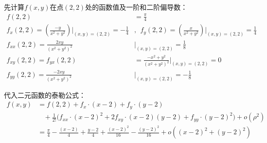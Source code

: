 \begin{solution}
先计算$f(x,y)$在点$(2,2)$处的函数值及一阶和二阶偏导数：
\begin{equation}
    \begin{aligned}
        f(2,2) &= \frac{\pi}{4} \\
        f_x(2,2) = \left(\frac{-y}{x^2+y^2} \right) \bigg|_{(x,y) = (2,2)} = -\frac{1}{4} &,~~
        f_y(2,2) = \left(\frac{x}{x^2+y^2} \right) \bigg|_{(x,y) = (2,2)} = \frac{1}{4}  \\
        f_{xx}(2,2) = \frac{2xy}{(x^2 + y^2)^2} &\bigg|_{(x,y)=(2,2)} = \frac{1}{8} \\
        f_{xy}(2,2) = f_{yx}(2,2) &= \frac{-x^2 + y^2}{(x^2 + y^2)^2} \bigg|_{(x,y) = (2,2)} = 0 \\
        f_{yy}(2,2) = \frac{-2xy}{(x^2 + y^2)^2} &\bigg|_{(x,y)=(2,2)} = -\frac{1}{8}
    \end{aligned}
    \nonumber
\end{equation}

代入二元函数的泰勒公式：
\begin{equation}
    \begin{aligned}
        f(x,y) &= f(2,2) + f_x \cdot (x-2) + f_y\cdot (y-2) \\
        &~~~~+\frac{1}{2!} \bigg(f_{xx} \cdot(x-2)^2 + 2f_{xy}\cdot (x-2)(y-2) + f_{yy}\cdot (y-2)^2 \bigg) + o(\rho^2) \\
        &= \frac{\pi}{4} - \frac{(x-2)}{4} + \frac{y-2}{4}
        + \frac{(x-2)^2}{16} - \frac{(y-2)^2}{16} + o\left((x-2)^2 + (y-2)^2 \right)
        \nonumber
    \end{aligned}
\end{equation}
\end{solution}

